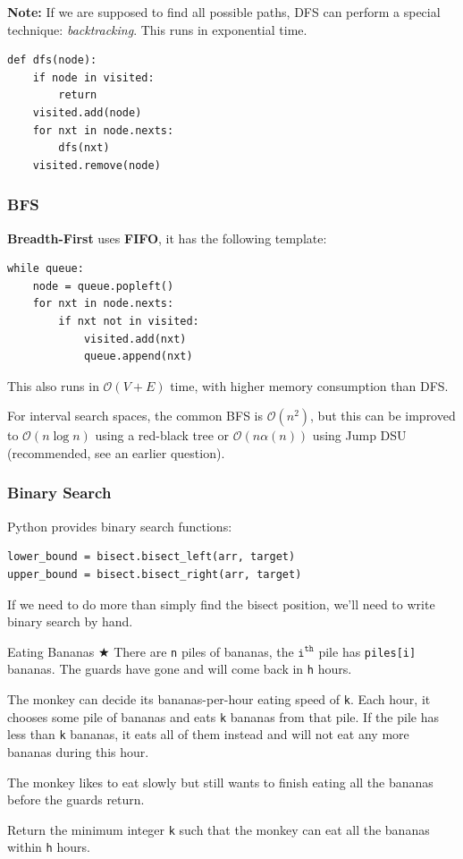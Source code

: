 \documentclass{article}
\begin{document}
\textbf{Note:} If we are supposed to find all possible paths, DFS can perform a special technique: \emph{backtracking}. This runs in exponential time.

\begin{lstlisting}[style=python]
def dfs(node):
    if node in visited:
        return
    visited.add(node)
    for nxt in node.nexts:
        dfs(nxt)
    visited.remove(node)
\end{lstlisting}

\subsubsection{BFS}

\textbf{Breadth-First} uses \textbf{FIFO}, it has the following template:

\begin{lstlisting}[style=python]
while queue:
    node = queue.popleft()
    for nxt in node.nexts:
        if nxt not in visited:
            visited.add(nxt)
            queue.append(nxt)
\end{lstlisting}

This also runs in $\mathcal{O}(V+E)$ time, with higher memory consumption than DFS.

For interval search spaces, the common BFS is $\mathcal{O}(n^2)$, but this can be improved to $\mathcal{O}(n\log n)$ using a red-black tree or $\mathcal{O}(n\alpha(n))$ using Jump DSU (recommended, see an earlier question).

\subsubsection{Binary Search}

Python provides binary search functions:

\begin{lstlisting}[style=python]
lower_bound = bisect.bisect_left(arr, target)
upper_bound = bisect.bisect_right(arr, target)
\end{lstlisting}

If we need to do more than simply find the bisect position, we'll need to write binary search by hand.

\begin{Question}{Eating Bananas $\bigstar$}
There are \texttt{n} piles of bananas, the $\texttt{i}^{\texttt{th}}$ pile has \texttt{piles[i]} bananas. The guards have gone and will come back in \texttt{h} hours.

The monkey can decide its bananas-per-hour eating speed of \texttt{k}. Each hour, it chooses some pile of bananas and eats \texttt{k} bananas from that pile. If the pile has less than \texttt{k} bananas, it eats all of them instead and will not eat any more bananas during this hour.

The monkey likes to eat slowly but still wants to finish eating all the bananas before the guards return.

Return the minimum integer \texttt{k} such that the monkey can eat all the bananas within \texttt{h} hours.
\end{Question}
\end{document}
